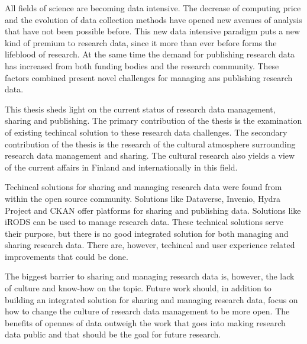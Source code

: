 All fields of science are becoming data intensive. The decrease of computing
price and the evolution of data collection methods have opened new avenues of
analysis that have not been possible before. This new data intensive paradigm
puts a new kind of premium to research data, since it more than ever before
forms the lifeblood of research. At the same time the demand for publishing
research data has increased from both funding bodies and the research
community. These factors combined present novel challenges for managing
ans publishing research data.

This thesis sheds light on the current status of research data management,
sharing and publishing. The primary contribution of the thesis is the
examination of existing techincal solution to these research data challenges.
The secondary contribution of the thesis is the research of the cultural
atmosphere surrounding research data management and sharing. The cultural
research also yields a view of the current affairs in Finland and
internationally in this field.

Techincal solutions for sharing and managing research data were found from
within the open source community. Solutions like Dataverse, Invenio, Hydra
Project and CKAN offer platforms for sharing and publishing data. Solutions
like iRODS can be used to manage research data. These technical solutions serve
their purpose, but there is no good integrated solution for both managing and
sharing research data. There are, however, techincal and user experience
related improvements that could be done.

The biggest barrier to sharing and managing research data is, however, the
lack of culture and know-how on the topic. Future work should, in addition to
building an integrated solution for sharing and managing research data, focus
on how to change the culture of research data management to be more open. The
benefits of opennes of data outweigh the work that goes into making research
data public and that should be the goal for future research.


